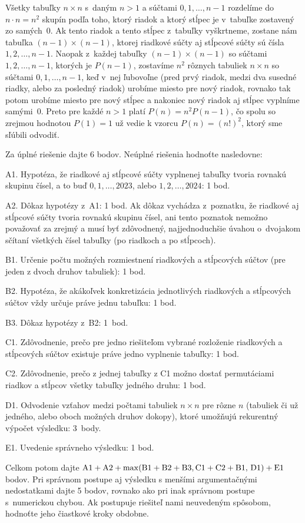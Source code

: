 {Všetky tabuľky $n\times n$ s~daným $n>1$ a súčtami $0,1,\dots,n-1$
rozdelíme do $n\cdot n=n^2$ skupín podľa toho,
ktorý riadok a ktorý stĺpec je v~tabuľke zostavený zo samých~$0$.
Ak tento riadok a tento stĺpec z~tabuľky vyškrtneme,
zostane nám tabuľka $(n-1)\times(n-1)$, ktorej riadkové súčty aj
stĺpcové súčty sú čísla $1,2,\dots,n-1$. Naopak z~každej tabuľky
$(n-1)\times(n-1)$ so súčtami $1,2,\dots,n-1$,
ktorých je $P(n-1)$, zostavíme $n^2$ rôznych tabuliek $n\times n$
so súčtami $0,1,\dots,n-1$, keď v~nej ľubovoľne (pred prvý riadok, medzi dva
susedné riadky, alebo za posledný riadok) urobíme miesto
pre nový riadok, rovnako tak potom urobíme miesto pre nový stĺpec
a nakoniec nový riadok aj stĺpec vyplníme samými~$0$.
Preto pre každé $n>1$ platí $P(n)=n^2P(n-1)$, čo spolu
so zrejmou hodnotou $P(1)=1$ už vedie k vzorcu $P(n)=(n!)^2$,
ktorý sme sľúbili odvodiť.

\schemaABC
Za úplné riešenie dajte 6 bodov. Neúplné riešenia
hodnoťte nasledovne:

\smallskip
\item{A1.} Hypotéza, že riadkové aj stĺpcové súčty vyplnenej tabuľky tvoria rovnakú skupinu čísel, a to buď $0,1,\dots,2023$, alebo $1,2,\dots,2024$: 1 bod.
\item{A2.} Dôkaz hypotézy z~A1: 1 bod. Ak dôkaz vychádza z~poznatku, že riadkové aj stĺpcové súčty tvoria rovnakú skupinu čísel, ani tento poznatok nemožno považovať za zrejmý a musí byť zdôvodnený, najjednoduchšie úvahou o~dvojakom sčítaní všetkých čísel tabuľky (po riadkoch a po stĺpcoch).
\item{B1.} Určenie počtu možných rozmiestnení riadkových a stĺpcových súčtov (pre jeden z dvoch druhov tabuliek): 1 bod.
\item{B2.} Hypotéza, že akákoľvek konkretizácia jednotlivých riadkových a stĺpcových súčtov vždy určuje práve jednu tabuľku: 1 bod.
\item{B3.} Dôkaz hypotézy z~B2: 1~bod.
\item{C1.} Zdôvodnenie, prečo pre jedno riešiteľom vybrané rozloženie riadkových a stĺpcových súčtov existuje práve jedno vyplnenie tabuľky: 1 bod.
\item{C2.} Zdôvodnenie, prečo z jednej tabuľky z C1 možno dostať permutáciami riadkov a stĺpcov všetky tabuľky jedného druhu: 1 bod.
\item{D1.} Odvodenie vzťahov medzi počtami tabuliek $n\times n$ pre rôzne $n$ (tabuliek či už jedného, alebo oboch možných druhov dokopy), ktoré umožňujú rekurentný výpočet výsledku: 3~body.
\item{E1.} Uvedenie správneho výsledku: 1 bod.

\smallskip\noindent
Celkom potom dajte
$\rm A1+A2+\max(B1+B2+B3,C1+C2+B1,\,D1)+E1$ bodov.
Pri správnom postupe aj výsledku s menšími argumentačnými
nedostatkami dajte 5 bodov, rovnako ako pri inak správnom postupe
s~numerickou chybou. Ak postupuje riešiteľ nami neuvedeným spôsobom,
hodnoťte jeho čiastkové kroky obdobne.
\endschema
}

